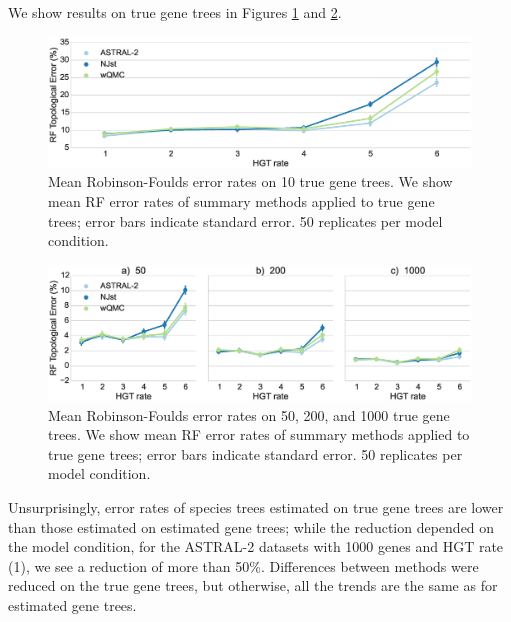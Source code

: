We show results on true gene trees in Figures \ref{hgt::fig5} and
\ref{hgt::fig6}.
  \begin{figure}[h!]
 \includegraphics[width=12cm]{hgt-figs/10-true.eps}
 \caption[Mean Robinson-Foulds error rates on 10 true gene trees]{{Mean Robinson-Foulds error rates on 10 true gene trees}. We show
mean RF error rates of summary
methods applied to true gene trees;  error bars indicate standard error. 50
replicates per model condition.}
\label{hgt::fig5}
      \end{figure}
  \begin{figure}[h!]
 \includegraphics[width=12cm]{hgt-figs/more-true-row.eps}
 \caption[Mean Robinson-Foulds error  rates on 50, 200, 
and 1000 true gene trees]{{Mean Robinson-Foulds error  rates on 50, 200, 
and 1000 true gene trees}. We show
mean RF error rates of summary
methods applied to true gene trees; error bars indicate standard error. 
50 replicates per model condition.}
\label{hgt::fig6}
      \end{figure}
Unsurprisingly, error rates of species trees estimated on true gene trees are lower than those estimated on estimated gene trees;
while the reduction
depended on the model condition,  for the ASTRAL-2 datasets
with 1000 genes and HGT rate (1), we see a reduction of more than 50\%.    
Differences between methods were reduced on the true gene trees, but
otherwise, all the trends are the same as for estimated gene trees.
 
